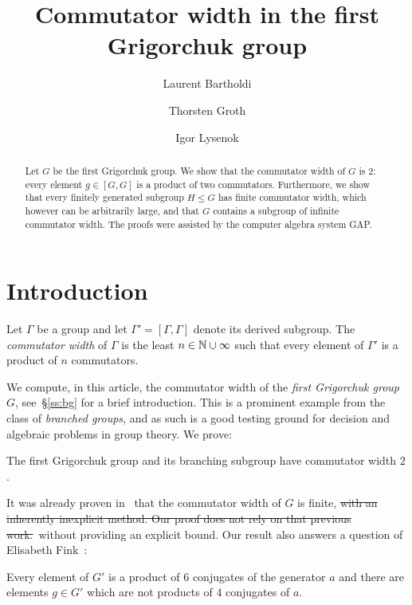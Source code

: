 \documentclass[a4paper,11pt]{amsart}
\newcommand\replace[2]{\st{#1}{\color{Green4}\ #2}}
\begin{document}
\title{Commutator width in the first Grigorchuk group}
\author{Laurent Bartholdi}
\author{Thorsten Groth}
\author{Igor Lysenok}
\begin{abstract}
  Let $G$ be the first Grigorchuk group.  We show that the commutator
  width of $G$ is $2$: every element $g\in [G,G]$ is a product of two
  commutators. Furthermore, we show that every finitely generated
  subgroup $H\leq G$ has finite commutator width, which however can be
  arbitrarily large, and that $G$ contains a subgroup of infinite commutator width. The proofs were assisted by the computer algebra
  system GAP.
\end{abstract}
\maketitle

\section{Introduction}
Let $\Gamma$ be a group and let $\Gamma'=[\Gamma,\Gamma]$ denote its
derived subgroup. The \emph{commutator width} of $\Gamma$ is the least
$n\in \mathbb{N}\cup \infty$ such that every element of $\Gamma'$ is a
product of $n$ commutators.

We compute, in this article, the commutator width of the \emph{first
  Grigorchuk group} $G$, see~\S\ref{ss:bg} for a brief
introduction. This is a prominent example from the class of
\emph{branched groups}, and as such is a good testing ground for
decision and algebraic problems in group theory. We prove:
\begin{thma}\label{thm:CWGrigorchukGroup}
  The first Grigorchuk group and its branching subgroup have
  commutator width $2$.
\end{thma}
It was already proven in~\cite{Lysenok-Miasnikov-Ushakov:QuadraticEquationsInGrig} that
the commutator width of $G$ is finite, 
\replace{with an inherently inexplicit method. Our proof does not rely on that previous work.}
{without providing an explicit bound.}
Our result also
answers a question of Elisabeth
Fink~\cite[Question~3]{Fink:Conjugacy_growth}:
\begin{cora}\label{cor:productOf6Conjugates}
  Every element of $G'$ is a product of $6$ conjugates of the
  generator $a$ and there are elements $g\in G'$ which are 
  not products of $4$ conjugates of $a$.
\end{cora}
\end{document}
